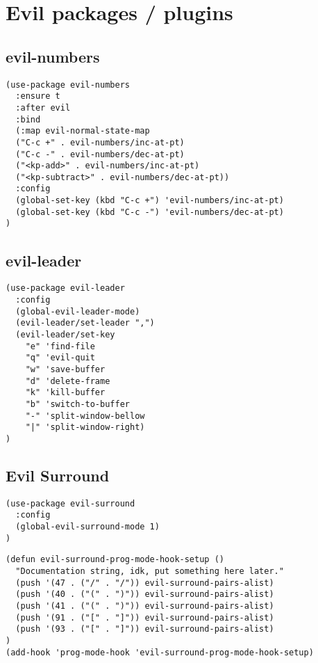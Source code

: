 \documentclass[11pt]{article}
\begin{document}
\section*{Evil packages / plugins}
\label{sec:org3371b48}

\subsection*{evil-numbers}
\label{sec:orgea45698}
\begin{verbatim}
(use-package evil-numbers
  :ensure t
  :after evil
  :bind
  (:map evil-normal-state-map
  ("C-c +" . evil-numbers/inc-at-pt)
  ("C-c -" . evil-numbers/dec-at-pt)
  ("<kp-add>" . evil-numbers/inc-at-pt)
  ("<kp-subtract>" . evil-numbers/dec-at-pt))
  :config
  (global-set-key (kbd "C-c +") 'evil-numbers/inc-at-pt)
  (global-set-key (kbd "C-c -") 'evil-numbers/dec-at-pt)
)
\end{verbatim}

\subsection*{evil-leader}
\label{sec:orgb03f243}

\begin{verbatim}
(use-package evil-leader
  :config
  (global-evil-leader-mode)
  (evil-leader/set-leader ",")
  (evil-leader/set-key
    "e" 'find-file
    "q" 'evil-quit
    "w" 'save-buffer
    "d" 'delete-frame
    "k" 'kill-buffer
    "b" 'switch-to-buffer
    "-" 'split-window-bellow
    "|" 'split-window-right)
)
\end{verbatim}

\subsection*{Evil Surround}
\label{sec:org15faf2e}

\begin{verbatim}
(use-package evil-surround
  :config
  (global-evil-surround-mode 1)
)
\end{verbatim}

\begin{verbatim}
(defun evil-surround-prog-mode-hook-setup ()
  "Documentation string, idk, put something here later."
  (push '(47 . ("/" . "/")) evil-surround-pairs-alist)
  (push '(40 . ("(" . ")")) evil-surround-pairs-alist)
  (push '(41 . ("(" . ")")) evil-surround-pairs-alist)
  (push '(91 . ("[" . "]")) evil-surround-pairs-alist)
  (push '(93 . ("[" . "]")) evil-surround-pairs-alist)
)
(add-hook 'prog-mode-hook 'evil-surround-prog-mode-hook-setup)
\end{verbatim}
\end{document}
